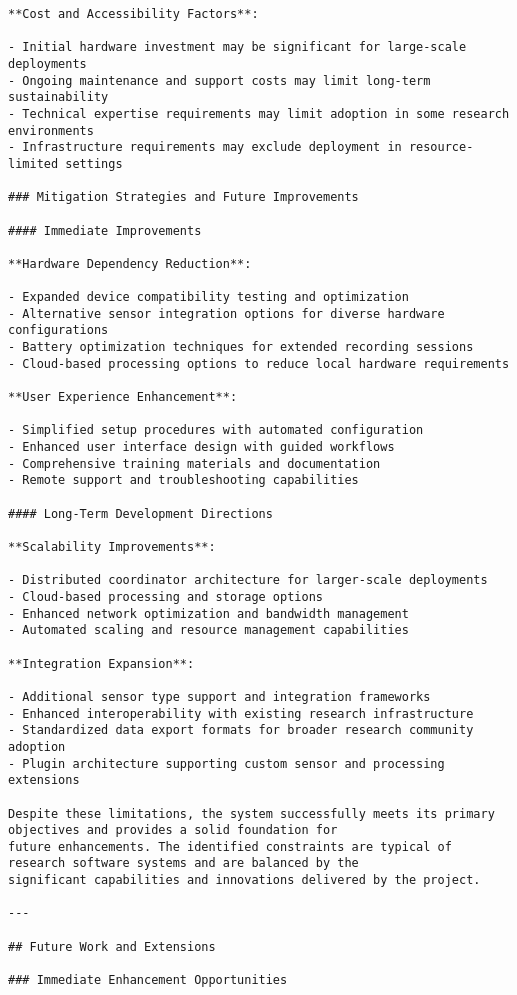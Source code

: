 \documentclass[12pt,a4paper]{report}
\begin{document}
\begin{verbatim}
**Cost and Accessibility Factors**:

- Initial hardware investment may be significant for large-scale deployments
- Ongoing maintenance and support costs may limit long-term sustainability
- Technical expertise requirements may limit adoption in some research environments
- Infrastructure requirements may exclude deployment in resource-limited settings

### Mitigation Strategies and Future Improvements

#### Immediate Improvements

**Hardware Dependency Reduction**:

- Expanded device compatibility testing and optimization
- Alternative sensor integration options for diverse hardware configurations
- Battery optimization techniques for extended recording sessions
- Cloud-based processing options to reduce local hardware requirements

**User Experience Enhancement**:

- Simplified setup procedures with automated configuration
- Enhanced user interface design with guided workflows
- Comprehensive training materials and documentation
- Remote support and troubleshooting capabilities

#### Long-Term Development Directions

**Scalability Improvements**:

- Distributed coordinator architecture for larger-scale deployments
- Cloud-based processing and storage options
- Enhanced network optimization and bandwidth management
- Automated scaling and resource management capabilities

**Integration Expansion**:

- Additional sensor type support and integration frameworks
- Enhanced interoperability with existing research infrastructure
- Standardized data export formats for broader research community adoption
- Plugin architecture supporting custom sensor and processing extensions

Despite these limitations, the system successfully meets its primary objectives and provides a solid foundation for
future enhancements. The identified constraints are typical of research software systems and are balanced by the
significant capabilities and innovations delivered by the project.

---

## Future Work and Extensions

### Immediate Enhancement Opportunities


\end{verbatim}
\end{document}
